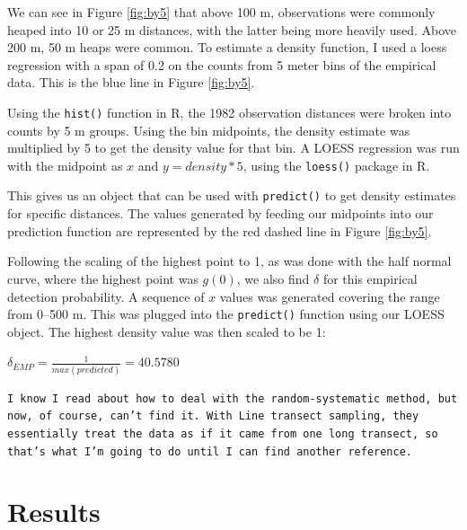\documentclass[12pt]{article}
\begin{document}
We can see in Figure \ref{fig:by5} that above 100 m, observations were commonly heaped into 10 or 25 m distances, with the latter being more heavily used. Above 200 m, 50 m heaps were common. To estimate a density function, I used a loess regression with a span of 0.2 on the counts from 5 meter bins of the empirical data. This is the blue line in Figure \ref{fig:by5}. 

Using the \texttt{hist()} function in R, the 1982 observation distances were broken into counts by 5 m groups. Using the bin midpoints, the density estimate was multiplied by 5 to get the density value for that bin. A LOESS regression was run with the midpoint as $x$ and $y=density*5$, using the \texttt{loess()} package in R.

This gives us an object that can be used with \texttt{predict()} to get density estimates for specific distances. The values generated by feeding our midpoints into our prediction function are represented by the red dashed line in Figure \ref{fig:by5}. 

Following the scaling of the highest point to 1, as was done with the half normal curve, where the highest point was $g(0)$, we also find $\delta$ for this empirical detection probability. A sequence of $x$ values was generated covering the range from 0--500 m. This was plugged into the \texttt{predict()} function using our LOESS object. The highest density value was then scaled to be 1:

$\delta_{EMP}=\frac{1}{max(predicted)}=40.5780$ 

\texttt{I know I read about how to deal with the random-systematic method, but now, of course, can't find it. With Line transect sampling, they essentially treat the data as if it came from one long transect, so that's what I'm going to do until I can find another reference.}

\section{Results}
\end{document}
